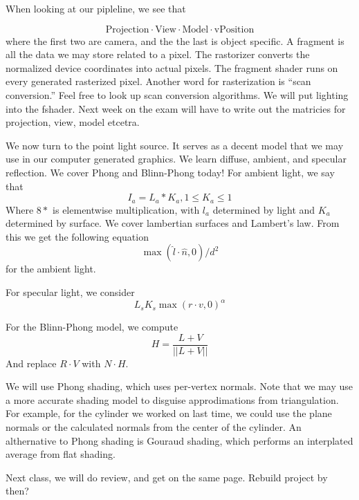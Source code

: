 \documentclass{article}
\begin{document}
When looking at our pipleline, we see that

\[ \text{Projection} \cdot \text{View} \cdot \text{Model} \cdot
\text{vPosition} \]
where the first two are camera, and the the last is object specific. A fragment
is all the data we may store related to a pixel. The rastorizer converts the
normalized device coordinates into actual pixels. The fragment shader runs on
every generated rasterized pixel. Another word for rasterization is ``scan
conversion.'' Feel free to look up scan conversion algorithms. We will put
lighting into the fshader. Next week on the exam will have to write out the
matricies for projection, view, model etcetra. 

We now turn to the point light source. It serves as a decent model that we may
use in our computer generated graphics. We learn diffuse, ambient, and specular
reflection. We cover Phong and Blinn-Phong today! 
For ambient light, we say that
\[ I_{a} = L_a * K_a, 1 \leq K_a \leq 1 \]
Where $8*$ is elementwise multiplication, with $l_a$ determined by light and
$K_a$ determined by surface. We cover lambertian surfaces and Lambert's law.
From this we get the following equation
\[ \max(\hat{l}\cdot \hat{n}, 0 )/d^2 \]
for the ambient light.

For specular light, we consider
\[ L_s K_s \max(r \cdot v, 0)^{\alpha} \]

For the Blinn-Phong model, we compute
\[ H = \frac{L+V}{||L+V||} \]
And replace $R \cdot V$ with $N \cdot H$. 

We will use Phong shading, which uses per-vertex normals. Note that we may use a
more accurate shading model to disguise approdimations from triangulation. For
example, for the cylinder we worked on last time, we could use the plane normals
or the calculated normals from the center of the cylinder. An althernative to
Phong shading is Gouraud shading, which performs an interplated average from
flat shading. 

Next class, we will do review, and get on the same page. Rebuild project by
then?
\end{document}
